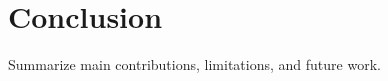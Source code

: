 \section{Conclusion}
\label{sec:conclusion}

Summarize main contributions, limitations, and future work.
